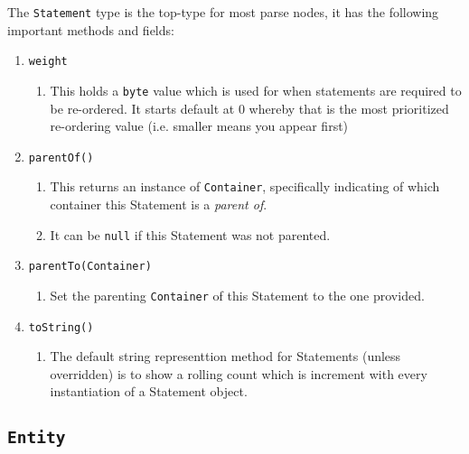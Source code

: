 The \texttt{Statement} type is the top-type for most parse nodes,
it has the following important methods and fields:
\begin{enumerate}
\item \texttt{weight}
\begin{enumerate}
\item This holds a \texttt{byte} value which is used for when statements
are required to be re-ordered. It starts default at 0 whereby that
is the most prioritized re-ordering value (i.e. smaller means you
appear first)
\end{enumerate}
\item \texttt{parentOf()}
\begin{enumerate}
\item This returns an instance of \texttt{Container}, specifically indicating
of which container this Statement is a \emph{parent of}.
\item It can be \texttt{null} if this Statement was not parented.
\end{enumerate}
\item \texttt{parentTo(Container)}
\begin{enumerate}
\item Set the parenting \texttt{Container} of this Statement to the one
provided.
\end{enumerate}
\item \texttt{toString()}
\begin{enumerate}
\item The default string representtion method for Statements (unless overridden)
is to show a rolling count which is increment with every instantiation
of a Statement object.
\end{enumerate}
\end{enumerate}

\subsection{\texttt{Entity}}

